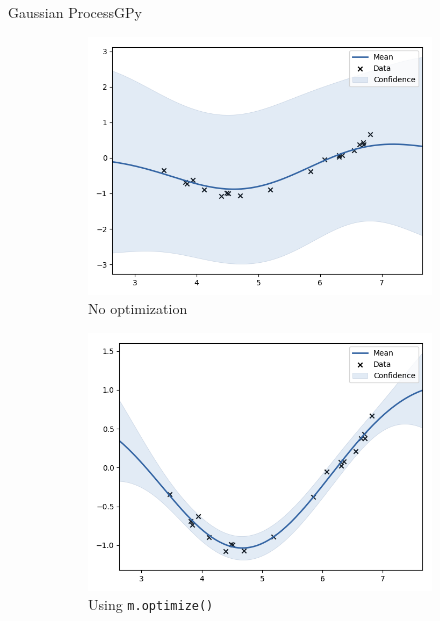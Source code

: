 \documentclass{beamer}
\begin{document}
\begin{frame}[fragile]{Gaussian Process}{GPy}
	
	\begin{figure}[!t]
		\centering  
		\begin{subfigure}[b]{0.45\linewidth}
			\centering 
			\includegraphics[scale=0.3]{example_preopt.png}
			\caption{No optimization}
		\end{subfigure}
		\begin{subfigure}[b]{0.45\linewidth}
			\centering    
			\includegraphics[scale=0.3]{example_postopt.png}
			\caption{Using \texttt{m.optimize()}}
		\end{subfigure}
		\caption{}
	\end{figure}

\end{frame}
\end{document}
